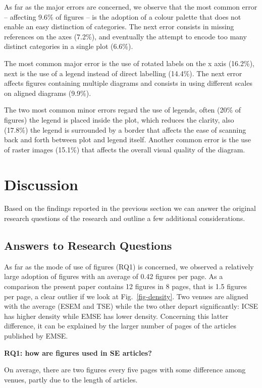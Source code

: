 \documentclass[
  10pt,
  conference,
]{IEEEtran}%
\begin{document}
As far as the major errors are concerned, we observe that the most
common error -- affecting 9.6\% of figures -- is the adoption of a
colour palette that does not enable an easy distinction of categories.
The next error consists in missing references on the axes (7.2\%), and
eventually the attempt to encode too many distinct categories in a
single plot (6.6\%).

The most common major error is the use of rotated labels on the x axis
(16.2\%), next is the use of a legend instead of direct labelling
(14.4\%). The next error affects figures containing multiple diagrams
and consists in using different scales on aligned diagrams (9.9\%).

The two most common minor errors regard the use of legends, often (20\%
of figures) the legend is placed inside the plot, which reduces the
clarity, also (17.8\%) the legend is surrounded by a border that affects
the ease of scanning back and forth between plot and legend itself.
Another common error is the use of raster images (15.1\%) that affects
the overall visual quality of the diagram.

\section{Discussion}\label{discussion}

Based on the findings reported in the previous section we can answer the
original research questions of the research and outline a few additional
considerations.

\subsection{Answers to Research
Questions}\label{answers-to-research-questions}

As far as the mode of use of figures (RQ1) is concerned, we observed a
relatively large adoption of figures with an average of 0.42 figures per
page. As a comparison the present paper contains 12 figures in 8 pages,
that is 1.5 figures per page, a clear outlier if we look at
Fig.~\ref{fig-density}. Two venues are aligned with the average (ESEM
and TSE) while the two other depart significantly: ICSE has higher
density while EMSE has lower density. Concerning this latter difference,
it can be explained by the larger number of pages of the articles
published by EMSE.

\begin{tcolorbox}[enhanced jigsaw, arc=.35mm, breakable, left=2mm, colback=white, colframe=quarto-callout-note-color-frame, rightrule=.15mm, toprule=.15mm, opacityback=0, bottomrule=.15mm, leftrule=.75mm]

\vspace{-3mm}\textbf{RQ1: how are figures used in SE articles?}\vspace{3mm}

On average, there are two figures every five pages with some difference
among venues, partly due to the length of articles.

\end{tcolorbox}
\end{document}

